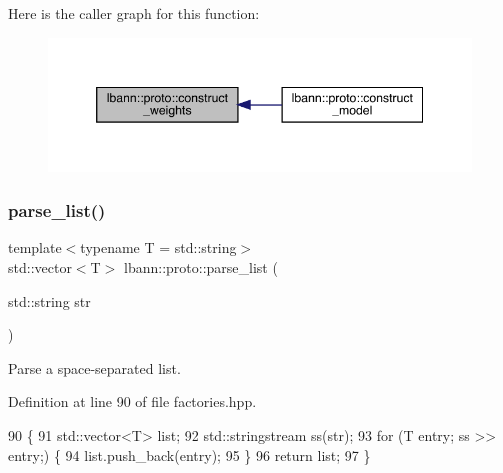 Here is the caller graph for this function\+:\nopagebreak
\begin{figure}[H]
\begin{center}
\leavevmode
\includegraphics[width=346pt]{namespacelbann_1_1proto_a1e95259d3e7fd20a9c361850940a398a_icgraph}
\end{center}
\end{figure}
\mbox{\label{namespacelbann_1_1proto_a6c6742da9015768123b7cddd74d17399}} 
\subsubsection{\texorpdfstring{parse\+\_\+list()}{parse\_list()}}
{\footnotesize\ttfamily template$<$typename T  = std\+::string$>$ \\
std\+::vector$<$T$>$ lbann\+::proto\+::parse\+\_\+list (\begin{DoxyParamCaption}\item[{std\+::string}]{str }\end{DoxyParamCaption})}

Parse a space-\/separated list. 

Definition at line 90 of file factories.\+hpp.


\begin{DoxyCode}
90                                        \{
91   std::vector<T> list;
92   std::stringstream ss(str);
93   \textcolor{keywordflow}{for} (T entry; ss >> entry;) \{
94     list.push\_back(entry);
95   \}
96   \textcolor{keywordflow}{return} list;
97 \}
\end{DoxyCode}

